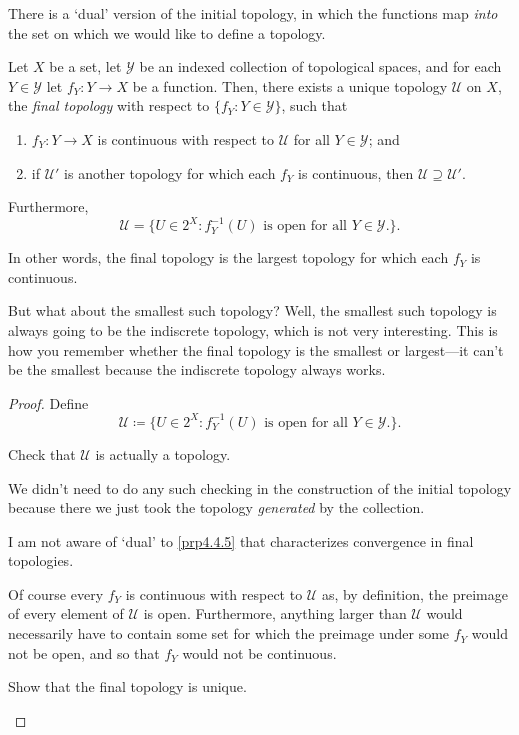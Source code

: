 There is a `dual' version of the initial topology, in which the functions map \emph{into} the set on which we would like to define a topology.
\begin{prp}\label{FinalTopology}
Let $X$ be a set, let $\mathcal{Y}$ be an indexed collection of topological spaces, and for each $Y\in \mathcal{Y}$ let $f_Y:Y\rightarrow X$ be a function.  Then, there exists a unique topology $\mathcal{U}$ on $X$, the \emph{final topology} with respect to $\{ f_Y:Y\in \mathcal{Y}\}$, such that
\begin{enumerate}
\item $f_Y:Y\rightarrow X$ is continuous with respect to $\mathcal{U}$ for all $Y\in \mathcal{Y}$; and
\item if $\mathcal{U}'$ is another topology for which each $f_Y$ is continuous, then $\mathcal{U}\supseteq \mathcal{U}'$.
\end{enumerate}
Furthermore,
\begin{equation}
\mathcal{U}=\{ U\in 2^X:f_Y^{-1}(U)\text{ is open for all }Y\in \mathcal{Y}\text{.}\} .
\end{equation}
\begin{rmk}
In other words, the final topology is the largest topology for which each $f_Y$ is continuous.
\end{rmk}
\begin{rmk}
But what about the smallest such topology?  Well, the smallest such topology is always going to be the indiscrete topology, which is not very interesting.  This is how you remember whether the final topology is the smallest or largest---it can't be the smallest because the indiscrete topology always works.
\end{rmk}
\begin{proof}
Define
\begin{equation}\label{3.4.9}
\mathcal{U}\coloneqq \{ U\in 2^X:f_Y^{-1}(U)\text{ is open for all }Y\in \mathcal{Y}\text{.}\} .
\end{equation}
\begin{exr}
Check that $\mathcal{U}$ is actually a topology.
\begin{rmk}
We didn't need to do any such checking in the construction of the initial topology because there we just took the topology \emph{generated} by the collection.
\end{rmk}
\begin{rmk}
I am not aware of `dual' to \cref{prp4.4.5} that characterizes convergence in final topologies.
\end{rmk}
\end{exr}
Of course every $f_Y$ is continuous with respect to $\mathcal{U}$ as, by definition, the preimage of every element of $\mathcal{U}$ is open.  Furthermore, anything larger than $\mathcal{U}$ would necessarily have to contain some set for which the preimage under some $f_Y$ would not be open, and so that $f_Y$ would not be continuous.
\begin{exr}
Show that the final topology is unique.
\end{exr}
\end{proof}
\end{prp}
